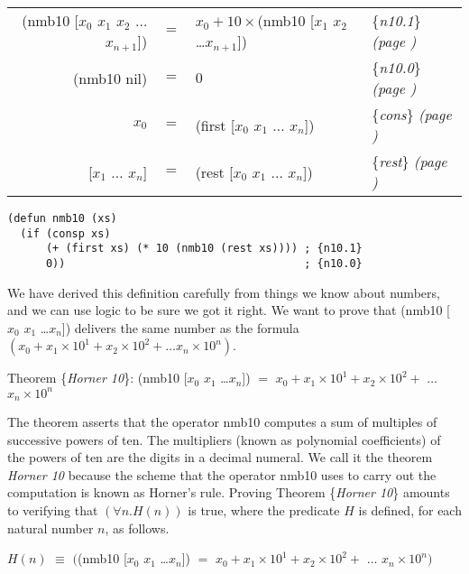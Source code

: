 \begin{center}
\addtolength{\tabcolsep}{-3pt}
\begin{tabular}{rlll}
\textsf{(nmb10 [$x_0$ $x_1$ $x_2$ $\dots$ $x_{n+1}$])} & $=$ &$x_0 + 10\times$\textsf{(nmb10 [$x_1$ $x_2$ \dots $x_{n+1}$])} &\{\emph{n10.1}\} \emph{(page \pageref{nmb10-defun})}\\
\textsf{(nmb10 nil)}                           & $=$ &$0$   &\{\emph{n10.0}\} \emph{(page \pageref{nmb10-defun})}\\
$x_0$                         & $=$ &\textsf{(first [$x_0$ $x_1$ $\dots$ $x_n$])} &\{\emph{cons}\} \emph{(page \pageref{first-rest-cons})}\\
\textsf{{[$x_1$ $\dots$ $x_n$]}}       & $=$ &\textsf{(rest  [$x_0$ $x_1$ $\dots$ $x_n$])} &\{\emph{rest}\} \emph{(page \pageref{first-rest-cons})}\\ %
\end{tabular}
\addtolength{\tabcolsep}{3pt}
\end{center}

\label{nmb10-defun}
\begin{Verbatim}
(defun nmb10 (xs)
  (if (consp xs)
      (+ (first xs) (* 10 (nmb10 (rest xs)))) ; {n10.1}
      0))                                     ; {n10.0}
\end{Verbatim}

We have derived this definition carefully
from things we know about numbers,
and we can use logic to be sure we got it right.
We want to prove that
\textsf{(nmb10 [$x_0$ $x_1$ \dots $x_{n}$])}
delivers the same number as the formula
$(x_0 + x_1 \times 10^1 + x_2 \times 10^2 + \dots x_{n} \times 10^{n})$.

\begin{center}
\label{horner10-thm}Theorem
\{\emph{Horner 10}\}:
\textsf{(nmb10 [$x_0$ $x_1$ \dots $x_{n}$])} $=$
$x_0 + x_1 \times 10^1 + x_2 \times 10^2 +$ $\dots$ $x_{n} \times 10^{n}$
\end{center}

The theorem asserts that the operator \textsf{nmb10}
computes a sum of multiples of successive powers of ten.
The multipliers
(known as polynomial coefficients)
of the powers of ten are the digits in a decimal numeral.
We call it the theorem \emph{Horner 10} because
the scheme that the operator \textsf{nmb10} uses to carry out the computation is
known as Horner's rule.
Proving Theorem \{\emph{Horner 10}\} amounts to
verifying that $(\forall n.H(n))$ is true,
where the predicate $H$ is defined, for each natural number $n$,
as follows.
\begin{center}
$H(n)$ $\equiv$ $($\textsf{(nmb10 [$x_0$ $x_1$ \dots $x_{n}$])} $=$
$x_0 + x_1 \times 10^1 + x_2 \times 10^2 +$ $\dots$ $x_{n} \times 10^{n})$
\end{center}

